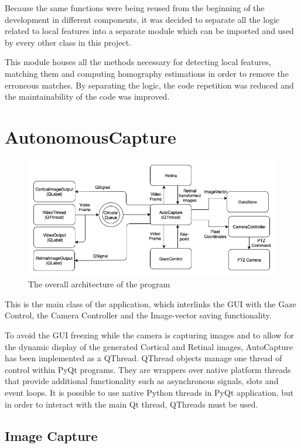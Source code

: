 \documentclass{l4proj}
\begin{document}
Because the same functions were being reused from the beginning of the development in different components, it was decided to separate all the logic related to local features into a separate module which can be imported and used by every other class in this project.

This module houses all the methods necessary for detecting local features, matching them and computing homography estimations in order to remove the erroneous matches. By separating the logic, the code repetition was reduced and the maintainability of the code was improved. 

\section{AutonomousCapture}


\begin{figure}[H]
    \centering
    \includegraphics[width=1\textwidth]{l4template-master/images/overallarchitecture.png}
    \caption{The overall architecture of the program}
    \label{overallarchitecture}
\end{figure}


This is the main class of the application, which interlinks the GUI with the Gaze Control, the Camera Controller and the Image-vector saving functionality. 


To avoid the GUI freezing while the camera is capturing images and to allow for the dynamic display of the generated Cortical and Retinal images, AutoCapture has been implemented as a QThread. QThread objects manage one thread of control within PyQt programs. They are wrappers over native platform threads that provide additional functionality such as asynchronous signals, slots and event loops. It is possible to use native Python threads in PyQt application, but in order to interact with the main Qt thread, QThreads must be used.

\subsection{Image Capture}
\end{document}
